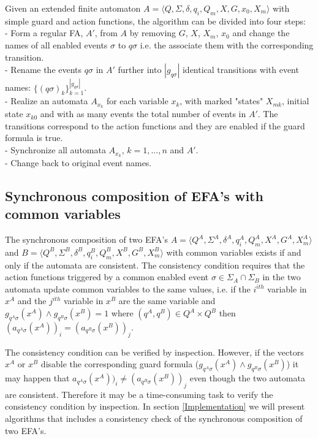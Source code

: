 \documentclass{article}
\begin{document}
Given an extended finite automaton $A=\langle Q, \Sigma, \delta,
q_i, Q_m, X, G ,x_0, X_m \rangle$ with simple guard and action
functions, the algorithm can be divided into four steps:\\
- Form a regular FA, $A'$, from $A$ by removing $G$, $X$, $X_m$,
$x_0$ and change the names of all enabled events $\sigma$ to
$q\sigma$ i.e. the associate them with the corresponding
transition.\\
- Rename the events $q\sigma$ in $A'$ further into $|g_{q \sigma}|$ identical transitions with event names: $\{(q\sigma)_k\}^{|g_{q \sigma}|}_{k=1}$.\\
- Realize an automata $A_{x_k}$ for each variable $x_k$, with
marked "states" $X_{mk}$, initial state $x_{k 0}$ and with as many events the total number of events in $A'$.
The transitions correspond to the action functions and they are enabled if the guard formula is true.\\
- Synchronize all automata $A_{x_k}$, $k=1,...,n$ and $A'$.\\
- Change back to original event names.
\newpage
\subsection{Synchronous composition of EFA's with common variables}

The synchronous composition of two EFA's $A=\langle Q^A, \Sigma^A,
\delta^A, q^A_i, Q^A_m, X^{A}, G^A, X^A_m \rangle$ and $B=\langle
Q^B, \Sigma^B, \delta^B, q^B_i, Q^B_m, X^{B}, G^B, X^B_m \rangle$
with common variables exists if and only if the automata are
consistent. The consistency condition requires that the action
functions triggered by a common enabled event $\sigma\in
\Sigma_{A}\cap \Sigma_{B}$ in the two automata update common
variables to the same values, i.e. if the $i^{ith}$ variable in
$x^{A}$ and the $j^{ith}$ variable in $x^{B}$ are the same
variable and $g_{q^A \sigma}(x^{A})\wedge g_{q^B \sigma}(x^{B})=1$
where $(q^A,q^B)\in Q^A\times Q^B$ then $(a_{q^A \sigma}(x^{A}))_i
= (a_{q^B \sigma}(x^{B}))_j$.

The consistency condition can be verified by inspection. However,
if the vectors $x^{A}$ or $x^{B}$ disable the corresponding guard
formula ($g_{q^A \sigma}(x^{A})\wedge g_{q^B \sigma}(x^{B})$) it
may happen that $a_{q^A \sigma}(x^{A}))_i \neq (a_{q^B
\sigma}(x^{B}))_j$ even though the two automata are consistent.
Therefore it may be a time-consuming task to verify the
consistency condition by inspection. In section
\ref{Implementation} we will present algorithms that includes a
consistency check of the synchronous
composition of two EFA's. \\
\end{document}
